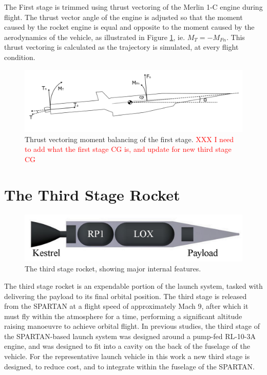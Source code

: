   The First stage is trimmed using thrust vectoring of the Merlin 1-C engine during flight. The thrust vector angle of the engine is adjusted so that the moment caused by the rocket engine is equal and opposite to the moment caused by the aerodynamics of the vehicle, as illustrated in Figure \ref{fig:FirstStageThrustVec}, ie. $M_T = -M_{Fn}$.
  This thrust vectoring is calculated as the trajectory is simulated, at every flight condition. 
 

\begin{figure}
\centering
\includegraphics[width=0.9\linewidth]{figures/3_vehicle_design/FirstStageThrustVec}
\caption{Thrust vectoring moment balancing of the first stage. \textcolor{red}{XXX I need to add what the first stage CG is, and update for new third stage CG}}
\label{fig:FirstStageThrustVec}
\end{figure}
  
  
  



	

	\section{The Third Stage Rocket}\label{sec:ThirdStageBaseline}

	\begin{figure}
\centering
\includegraphics[width=0.7\linewidth]{figures/3_vehicle_design/3rdStage}
\caption{The third stage rocket, showing major internal features.}
\label{fig:3rdStage}
\end{figure}

The third stage rocket is an expendable portion of the launch system, tasked with delivering the payload to its final orbital position. 
  The third stage is released from the SPARTAN at a flight speed of approximately Mach 9, after which it must fly within the atmosphere for a time, performing a significant altitude raising manoeuvre to achieve orbital flight\cite{Preller2017b}. 
  In previous studies, the third stage of the SPARTAN-based launch system was designed around a pump-fed RL-10-3A engine\cite{Preller2017b}, and was designed to fit into a cavity on the back of the fuselage of the vehicle\cite{Preller2017b}. For the representative launch vehicle in this work a new third stage is designed, to reduce cost, and to integrate within the fuselage of the SPARTAN. 
   
